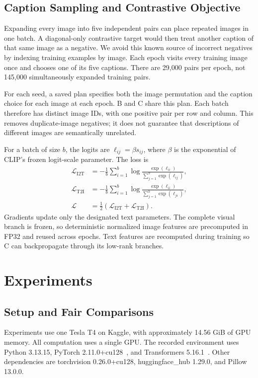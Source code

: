 \documentclass[conference]{IEEEtran}
\begin{document}
\subsection{Caption Sampling and Contrastive Objective}
Expanding every image into five independent pairs can place repeated images in one batch. A diagonal-only contrastive target would then treat another caption of that same image as a negative. We avoid this known source of incorrect negatives by indexing training examples by image. Each epoch visits every training image once and chooses one of its five captions. There are 29,000 pairs per epoch, not 145,000 simultaneously expanded training pairs.

For each seed, a saved plan specifies both the image permutation and the caption choice for each image at each epoch. B and C share this plan. Each batch therefore has distinct image IDs, with one positive pair per row and column. This removes duplicate-image negatives; it does not guarantee that descriptions of different images are semantically unrelated.

For a batch of size $b$, the logits are $\ell_{ij}=\beta s_{ij}$, where $\beta$ is the exponential of CLIP's frozen logit-scale parameter. The loss is
\begin{align}
\mathcal L_{\mathrm{I2T}} &=-\frac1b\sum_{i=1}^{b}
 \log\frac{\exp(\ell_{ii})}{\sum_{j=1}^{b}\exp(\ell_{ij})},\\
\mathcal L_{\mathrm{T2I}} &=-\frac1b\sum_{i=1}^{b}
 \log\frac{\exp(\ell_{ii})}{\sum_{j=1}^{b}\exp(\ell_{ji})},\\
\mathcal L &=\tfrac12(\mathcal L_{\mathrm{I2T}}+\mathcal L_{\mathrm{T2I}}).
\end{align}
Gradients update only the designated text parameters. The complete visual branch is frozen, so deterministic normalized image features are precomputed in FP32 and reused across epochs. Text features are recomputed during training so C can backpropagate through its low-rank branches.

\section{Experiments}
\subsection{Setup and Fair Comparisons}
Experiments use one Tesla T4 on Kaggle, with approximately 14.56 GiB of GPU memory. All computation uses a single GPU. The recorded environment uses Python 3.13.15, PyTorch 2.11.0+cu128~\cite{paszke2019pytorch}, and Transformers 5.16.1~\cite{wolf2020transformers}. Other dependencies are torchvision 0.26.0+cu128, huggingface\_hub 1.29.0, and Pillow 13.0.0.
\end{document}
